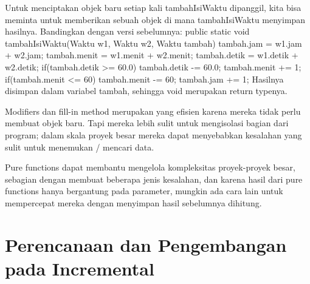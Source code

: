 Untuk menciptakan objek baru setiap kali tambahIsiWaktu dipanggil, kita bisa meminta untuk memberikan sebuah objek di mana tambahIsiWaktu menyimpan hasilnya. Bandingkan dengan versi sebelumnya:
\newline
public static void tambahIsiWaktu(Waktu w1, Waktu w2, Waktu tambah)\textbraceleft \newline
	tambah.jam = w1.jam + w2.jam; \newline
	tambah.menit = w1.menit + w2.menit; \newline
	tambah.detik = w1.detik + w2.detik; \newline
\newline
	if(tambah.detik \textgreater = 60.0)\textbraceleft \newline
		tambah.detik -= 60.0; \newline
		tambah.menit += 1; \newline
	\textbraceright \newline
\newline
	if(tambah.menit \textless = 60)\textbraceleft \newline
		tambah.menit -= 60; \newline
		tambah.jam += 1; \newline
	\textbraceright \newline
\textbraceright \newline
Hasilnya disimpan dalam variabel tambah, sehingga void merupakan return typenya.

Modifiers dan fill-in method merupakan yang efisien karena mereka tidak perlu membuat objek baru. Tapi mereka lebih sulit untuk mengisolasi bagian dari program; dalam skala proyek besar mereka dapat menyebabkan kesalahan yang sulit untuk menemukan / mencari data.

Pure functions dapat membantu mengelola kompleksitas proyek-proyek besar, sebagian dengan membuat beberapa jenis kesalahan, dan karena hasil dari pure functions hanya bergantung pada parameter, mungkin ada cara lain untuk mempercepat mereka dengan menyimpan hasil sebelumnya dihitung.
\newline
\section{Perencanaan dan Pengembangan pada Incremental}

